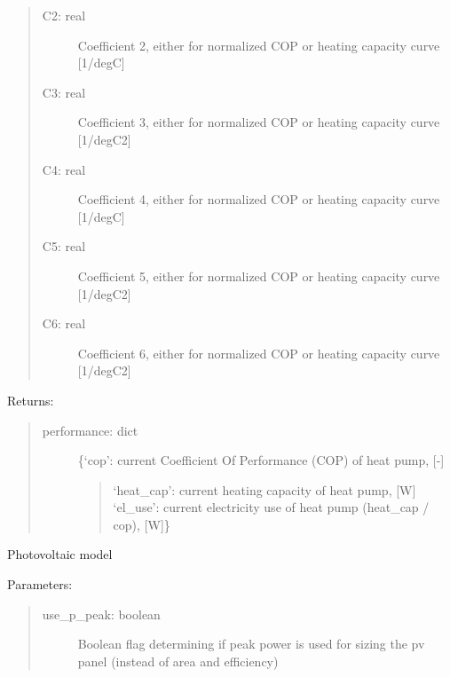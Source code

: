 \documentclass[letterpaper,10pt,english,openany]{sphinxmanual}
\begin{document}
\begin{fulllineitems}
\begin{fulllineitems}
\begin{quote}
\begin{description}
\item[{C2: real}] \leavevmode
Coefficient 2, either for normalized COP or heating
capacity curve {[}1/degC{]}

\item[{C3: real}] \leavevmode
Coefficient 3, either for normalized COP or heating
capacity curve {[}1/degC2{]}

\item[{C4: real}] \leavevmode
Coefficient 4, either for normalized COP or heating
capacity curve {[}1/degC{]}

\item[{C5: real}] \leavevmode
Coefficient 5, either for normalized COP or heating
capacity curve {[}1/degC2{]}

\item[{C6: real}] \leavevmode
Coefficient 6, either for normalized COP or heating
capacity curve {[}1/degC2{]}

\end{description}
\end{quote}

Returns:
\begin{quote}
\begin{description}
\item[{performance: dict}] \leavevmode
\{‘cop’: current Coefficient Of Performance (COP) of
heat pump, {[}-{]}
\begin{quote}

‘heat\_cap’: current heating capacity of heat pump, {[}W{]}
‘el\_use’: current electricity use of heat pump
(heat\_cap / cop), {[}W{]}\}
\end{quote}

\end{description}
\end{quote}

\end{fulllineitems}


\begin{fulllineitems}
\label{\detokenize{source/mswh.system:mswh.system.components.Converter.photovoltaic}}
Photovoltaic model

Parameters:
\begin{quote}
\begin{description}
\item[{use\_p\_peak: boolean}] \leavevmode
Boolean flag determining if peak power is used for sizing
the pv panel (instead of area and efficiency)


\end{description}
\end{quote}
\end{fulllineitems}
\end{fulllineitems}
\end{document}
